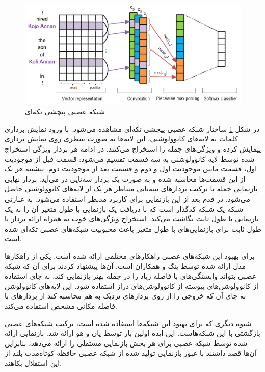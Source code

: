 \begin{figure}[h]
    \centering
    \includegraphics[width=0.8\linewidth]{images/pcnn.png}
    \caption{شبکه عصبی پیچشی تکه‌ای}
    \label{pcnn_architecture}
\end{figure}

در شکل \ref{pcnn_architecture} ساختار شبکه عصبی پیچشی تکه‌ای مشاهده می‌شود. با ورود نمایش برداری کلمات به لایه‌های
کانوولوشنی، این لایه‌ها به صورت سطری روی نمایش برداری پیمایش کرده و ویژگی‌های جمله را استخراج می‌کنند. در ادامه
هر بردار ویژگی استخراج شده توسط لایه کانوولوشنی به سه قسمت تقسیم می‌شود: قسمت قبل از موجودیت اول، قسمت مابین
موجودیت اول و دوم و قسمت بعد از موجودیت دوم. بیشینه هر یک از این قسمت‌ها محاسبه شده و به صورت یک بردار سه‌تایی
در می‌آید. بردار نهایی بازنمایی جمله با ترکیب بردار‌های سه‌تایی متناظر هر یک از لایه‌های کانوولوشنی حاصل می‌شود. در قدم
بعد از این بازنمایی برای کاربرد مدنظر استفاده می‌شود. به عبارتی شبکه  یک شبکه کدگذار است که با دریافت یک بازنمایی
با طول متغیر آن را به یک بازنمایی با طول ثابت نگاشت می‌کند. استخراج ویژگی‌های خوب به همراه ارائه بردار با طول ثابت
برای بازنمایی‌های با طول متغیر باعث محبوبیت شبکه‌های عصبی تکه‌ای شده است.

برای بهبود این شبکه‌های عصبی راهکار‌های مختلفی ارائه شده است. یکی از راهکار‌ها مدل ارائه شده توسط پنگ و همکاران
\cite{dilated} است. آن‌ها پیشنهاد کردند برای آن‌ که شبکه عصبی  بتواند وابستگی‌های با فاصله زیاد را در جمله
بهتر بازنمایی کند، به جای استفاده از کانوولوشن‌های پیوسته از کانوولوشن‌های دراز استفاده شود. این لایه‌های
کانوولوشن به جای آن که خروجی را از روی بردار‌های نزدیک به هم محاسبه کند از بردار‌های با فاصله مکانی مشخص
استفاده می‌کند.

شیوه دیگری که برای بهبود این شبکه‌ها استفاده شده است، ترکیب شبکه‌های عصبی بازگشتی با این شبکه‌هاست. این ایده اولین
بار توسط یان و هو \cite{lstm-pcnn} ارائه شد. بازنمایی ارائه شده توسط شبکه عصبی  برای هر بخش بازنمایی
مستقلی را ارائه می‌دهد، بنابراین آن‌ها قصد داشتند با عبور بازنمایی تولید شده از
شبکه عصبی حافظه کوتاه‌مدت بلند از این استقلال بکاهند.

